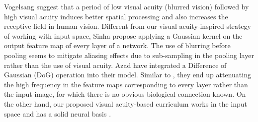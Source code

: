 %
Vogelsang \etal \cite{vogelsang2018VisualAcuity} suggest that a period of low visual acuity (blurred vision) followed by high visual acuity induces better spatial processing and also increases the receptive field in human vision. 
Different from our visual acuity-inspired strategy of working with input space, Sinha \etal \cite{sinha2020curriculumBySmoothing} propose applying a Gaussian kernel on the output feature map of every layer of a network. The use of blurring before pooling seems to mitigate aliasing effects due to sub-sampling in the pooling layer rather than the use of visual acuity. Azad \etal \cite{azad2020textureDoG} have integrated a Difference of Gaussian (DoG) operation into their model. Similar to \cite{sinha2020curriculumBySmoothing}, they end up attenuating the high frequency in the feature maps corresponding to every layer rather than the input image, for which there is no obvious biological connection known. On the other hand, our proposed visual acuity-based curriculum works in the input space and has a solid neural basis \cite{vogelsang2018VisualAcuity}.
